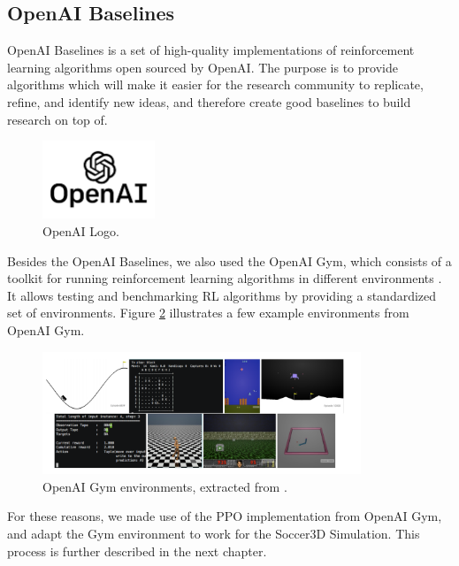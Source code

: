 \subsection{OpenAI Baselines}

OpenAI Baselines is a set of high-quality implementations of reinforcement learning algorithms open sourced by OpenAI. The purpose is to provide algorithms which will make it easier for the research community to replicate, refine, and identify new ideas, and therefore create good baselines to build research on top of. \cite{baselines}

\begin{figure}[H]
    \centering
    \includegraphics[width=0.3\textwidth]{Chapter5/openai_logo.jpg} 
    \caption{OpenAI Logo.}
    \label{fig:openai_logo}
\end{figure}

Besides the OpenAI Baselines, we also used the OpenAI Gym, which consists of a toolkit for running reinforcement learning algorithms in different environments \cite{OpenAIGym}. It allows testing and benchmarking RL algorithms by providing a standardized set of environments. Figure \ref{fig:openai_envs} illustrates a few example environments from OpenAI Gym.

\begin{figure}[H]
    \centering
    \includegraphics[width=0.85\textwidth]{Chapter5/openai_env.png} 
    \caption{OpenAI Gym environments, extracted from \cite{OpenAIGym}.}
    \label{fig:openai_envs}
\end{figure}

For these reasons, we made use of the PPO implementation from OpenAI Gym, and adapt the Gym environment to work for the Soccer3D Simulation. This process is further described in the next chapter.

